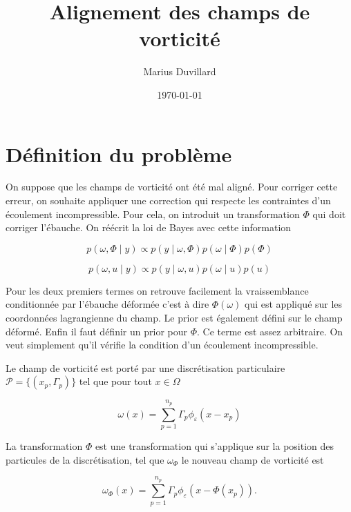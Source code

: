 \documentclass{article}
\begin{document}
\title{Alignement des champs de vorticité}
\author{Marius Duvillard}
\date{\today}
\maketitle


\section{Définition du problème}
On suppose que les champs de vorticité ont été mal aligné. Pour corriger cette erreur, on souhaite appliquer une correction qui respecte les contraintes d'un écoulement incompressible. Pour cela, on introduit un transformation $\Phi$ qui doit corriger l'ébauche.
On réécrit la loi de Bayes avec cette information

\begin{equation*}
    p(\omega,\Phi \mid y) \propto p(y \mid \omega, \Phi) p(\omega \mid \Phi) p(\Phi)
\end{equation*}

\begin{equation*}
    p(\omega,u \mid y) \propto p(y \mid \omega,u) p(\omega \mid u) p(u)
\end{equation*}

Pour les deux premiers termes on retrouve facilement la vraissemblance conditionnée par l'ébauche déformée c'est à dire $\Phi(\omega)$ qui est appliqué sur les coordonnées lagrangienne du champ.
Le prior est également défini sur le champ déformé. Enfin il faut définir un prior pour $\Phi$. Ce terme est assez arbitraire. On veut simplement qu'il vérifie la condition d'un écoulement incompressible.

Le champ de vorticité est porté par une discrétisation particulaire $\mathcal P = \{(x_p, \Gamma_p)\}$ tel que pour tout $x \in \Omega$

\begin{equation*}
    \omega(x) = \sum_{p = 1}^{n_p} \Gamma_p \phi_\varepsilon(x - x_p)
\end{equation*}

La transformation $\Phi$ est une transformation qui s'applique sur la position des particules de la discrétisation, tel que $\omega_\Phi$ le nouveau champ de vorticité est

\begin{equation*}
    \omega_\Phi(x) = \sum_{p = 1}^{n_p} \Gamma_p \phi_\varepsilon(x - \Phi(x_p)).
\end{equation*}
\end{document}
